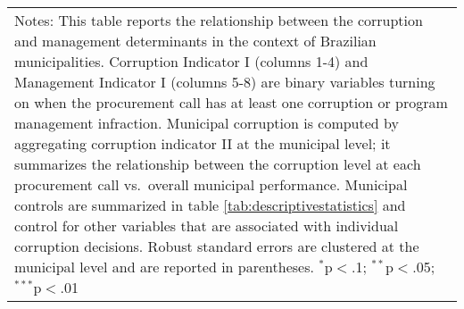 \documentclass[border = 1pt$]{standalone}
\begin{document}
\begin{tabular}{l@{\extracolsep{4pt}}c@{\extracolsep{1pt}}c@{\extracolsep{3pt}}c@{\extracolsep{1pt}}c@{\extracolsep{4pt}}c@{\extracolsep{1pt}}c@{\extracolsep{3pt}}c@{\extracolsep{1pt}}c@{\extracolsep{1pt}}}
\hline
\multicolumn{9}{p{\columnwidth}}{\scriptsize{Notes: This table reports the relationship between the corruption and management determinants in the context of Brazilian municipalities. Corruption Indicator I (columns 1-4) and Management Indicator I (columns 5-8) are binary variables turning on when the procurement call has at least one corruption or program management infraction. Municipal corruption is computed by aggregating corruption indicator II at the municipal level; it summarizes the relationship between the corruption level at each procurement call vs.~overall municipal performance. Municipal controls are summarized in table \ref{tab:descriptivestatistics} and control for other variables that are associated with individual corruption decisions. Robust standard errors are clustered at the municipal level and are reported in parentheses. $^{*}$p$<$.1; $^{**}$p$<$.05; $^{***}$p$<$.01}} \\
\end{tabular}
\end{document}
